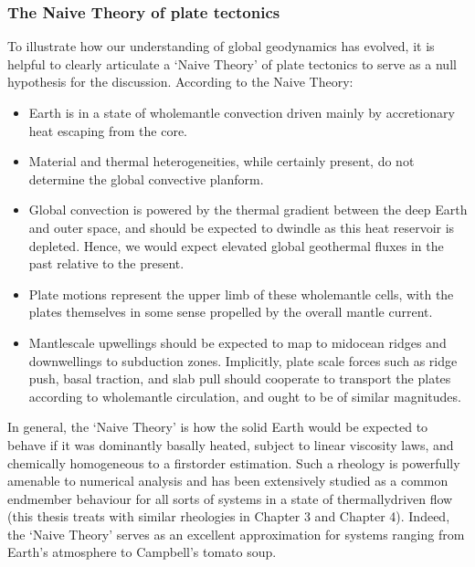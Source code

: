 \documentclass[letterpaper,10pt,english]{jupyterBook}
\begin{document}
\subsubsection{The Naive Theory of plate tectonics}
\label{\detokenize{content/chapter_01_background/main:the-naive-theory-of-plate-tectonics}}
\sphinxAtStartPar
To illustrate how our understanding of global geodynamics has evolved, it is helpful to clearly articulate a ‘Naive Theory’ of plate tectonics to serve as a null hypothesis for the discussion. According to the Naive Theory:
\begin{itemize}
\item {} 
\sphinxAtStartPar
Earth is in a state of whole\sphinxhyphen{}mantle convection driven mainly by accretionary heat escaping from the core.

\item {} 
\sphinxAtStartPar
Material and thermal heterogeneities, while certainly present, do not determine the global convective planform.

\item {} 
\sphinxAtStartPar
Global convection is powered by the thermal gradient between the deep Earth and outer space, and should be expected to dwindle as this heat reservoir is depleted. Hence, we would expect elevated global geothermal fluxes in the past relative to the present.

\item {} 
\sphinxAtStartPar
Plate motions represent the upper limb of these whole\sphinxhyphen{}mantle cells, with the plates themselves in some sense propelled by the overall mantle current.

\item {} 
\sphinxAtStartPar
Mantle\sphinxhyphen{}scale upwellings should be expected to map to mid\sphinxhyphen{}ocean ridges and downwellings to subduction zones. Implicitly, plate scale forces such as ridge push, basal traction, and slab pull should cooperate to transport the plates according to whole\sphinxhyphen{}mantle circulation, and ought to be of similar magnitudes.

\end{itemize}

\sphinxAtStartPar
In general, the ‘Naive Theory’ is how the solid Earth would be expected to behave if it was dominantly basally heated, subject to linear viscosity laws, and chemically homogeneous to a first\sphinxhyphen{}order estimation. Such a rheology is powerfully amenable to numerical analysis and has been extensively studied as a common end\sphinxhyphen{}member behaviour for all sorts of systems in a state of thermally\sphinxhyphen{}driven flow (this thesis treats with similar rheologies in Chapter 3 and Chapter 4). Indeed, the ‘Naive Theory’ serves as an excellent approximation for systems ranging from Earth’s atmosphere to Campbell’s tomato soup.
\end{document}
